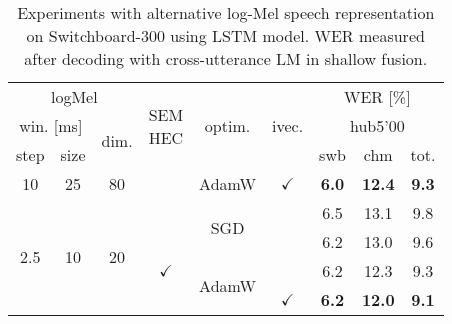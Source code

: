 \documentclass[a4paper]{article}
\begin{document}
\begin{table}
  \eightpt
  \centering
  \caption{Experiments with alternative log-Mel speech representation on Switchboard-300 using LSTM model. WER measured after decoding with cross-utterance LM in shallow fusion.}
  \vspace{-3.5mm}
  \begin{tabular}{|c|c|@{}c@{}|@{}c@{}|@{}c@{}|@{}c@{}||c|c|c|}
    \hline
\multicolumn{3}{|c|}{logMel}             &\multirow{3}{*}{\parbox[c]{6mm}{SEM\\HEC}}&  \multirow{3}{*}{\hspace{2mm}optim.\hspace{2mm}} & \multirow{3}{*}{\hspace{0.8mm}ivec.\hspace{0.8mm}} & \multicolumn{3}{c|}{WER [\%]} \\ \cline{7-9} \cline{1-3}
\multicolumn{2}{|c|}{win. [ms]}                 & \multirow{2}{*}{dim.} &      &              &        &  \multicolumn{3}{c|}{hub5'00} \\ \cline{1-2}\cline{7-9}
     step      &  size      &        & \hspace{7mm} & \hspace{2mm} &        &   swb   &  chm   & tot. \\
\hline
\hline
     10        &   25      & \hspace{1.7mm}80\hspace{1.7mm} &                                &  AdamW         &  $\checkmark$                 & {\bf 6.0} & \bf{12.4} & \bf{9.3} \\
\hline
\hline
\multirow{4}{*}{2.5} & \multirow{4}{*}{10} & \multirow{4}{*}{20} &                                & \multirow{2}{*}{SGD}           &                               & 6.5     & 13.1   & 9.8  \\ \cline{4-4} \cline{7-9}
               &           &             &  \multirow{3}{*}{$\checkmark$} &              &                               & 6.2     & 13.0   & 9.6  \\ \cline{5-5}\cline{7-9}
               &           &             &                                & \multirow{2}{*}{AdamW}        &                               & 6.2     & 12.3   & 9.3  \\ \cline{6-6}\cline{7-9}
               &           &             &                                &              & \multirow{1}{*}{$\checkmark$} & \bf 6.2 & \bf 12.0 & \bf 9.1  \\
\hline
\end{tabular}                              
\label{tab:hires}
\vspace{-4mm}
\end{table}
\end{document}
